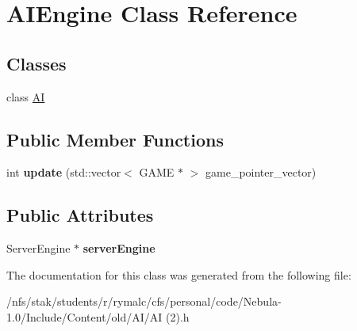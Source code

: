 \hypertarget{classAIEngine}{
\section{AIEngine Class Reference}
\label{classAIEngine}
}
\subsection*{Classes}
\begin{DoxyCompactItemize}
\item 
class \hyperlink{classAIEngine_1_1AI}{AI}
\end{DoxyCompactItemize}
\subsection*{Public Member Functions}
\begin{DoxyCompactItemize}
\item 
\hypertarget{classAIEngine_a700c2f753a9f0fef47ddc1d3e22f76b0}{
int {\bfseries update} (std::vector$<$ GAME $\ast$ $>$ game\_\-pointer\_\-vector)}
\label{classAIEngine_a700c2f753a9f0fef47ddc1d3e22f76b0}

\end{DoxyCompactItemize}
\subsection*{Public Attributes}
\begin{DoxyCompactItemize}
\item 
\hypertarget{classAIEngine_a1b4e8fa64aea9f1cb429e247d2276b01}{
ServerEngine $\ast$ {\bfseries serverEngine}}
\label{classAIEngine_a1b4e8fa64aea9f1cb429e247d2276b01}

\end{DoxyCompactItemize}


The documentation for this class was generated from the following file:\begin{DoxyCompactItemize}
\item 
/nfs/stak/students/r/rymalc/cfs/personal/code/Nebula-\/1.0/Include/Content/old/AI/AI (2).h\end{DoxyCompactItemize}
